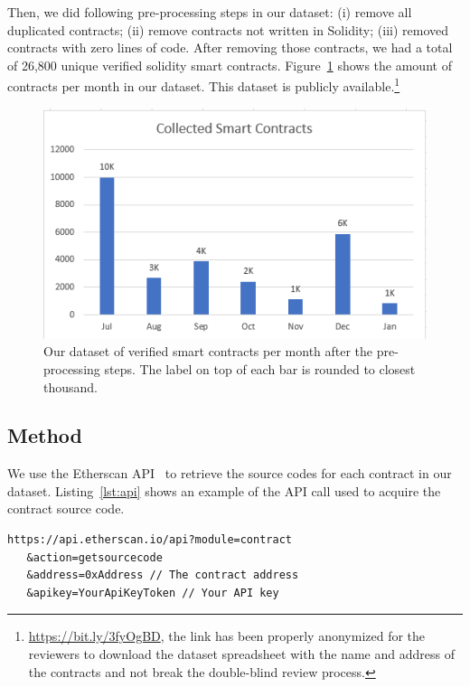 \documentclass[10pt,conference]{IEEEtran}
\begin{document}
Then, we did following pre-processing steps in our dataset: (i) remove all duplicated contracts; (ii) remove contracts not written in Solidity; (iii) removed contracts with zero lines of code. After removing those contracts, we had a total of 26,800 unique verified solidity smart contracts. Figure~\ref{fig:dataset} shows the amount of contracts per month in our dataset. This dataset is publicly available.\footnote{\url{https://bit.ly/3fyOgBD}, the link has been properly anonymized for the reviewers to download the dataset spreadsheet with the name and address of the contracts and not break the double-blind review process. }

\begin{figure}[h]
  \centering
  \includegraphics[width=\linewidth]{img/collected_contracts.PNG}
  \caption{Our dataset of verified smart contracts per month after the pre-processing steps. The label on top of each bar is rounded to closest thousand.}
  \label{fig:dataset}
\end{figure}

\subsection{Method}

We use the Etherscan API~\cite{etherscan_api} to retrieve the source codes for each contract in our dataset. Listing~\ref{lst:api} shows an example of the API call used to acquire the contract source code. 
\begin{lstlisting}[language=solidity, caption=Etherscan API call, label={lst:api}]
https://api.etherscan.io/api?module=contract
   &action=getsourcecode
   &address=0xAddress // The contract address
   &apikey=YourApiKeyToken // Your API key
\end{lstlisting}
\end{document}
